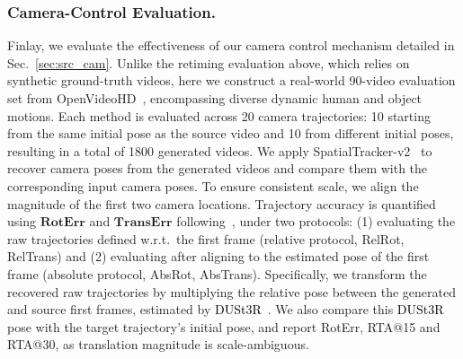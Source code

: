 \documentclass[10pt,twocolumn,letterpaper]{article}
\newcommand{\nameCOLOR}[1]{\textcolor{black}{#1}}
\newcommand{\duster}{\nameCOLOR{\mbox{DUSt3R}}\xspace}
\newcommand{\todo}[1]{{\color{black}#1}}
\begin{document}

















\subsubsection{Camera-Control Evaluation.}
Finlay, we evaluate the effectiveness of our camera control mechanism detailed in Sec.~\ref{sec:src_cam}.
Unlike the retiming evaluation above, which relies on synthetic ground-truth videos, here we construct a real-world 90-video evaluation set from OpenVideoHD~\cite{nan2024openvid}, encompassing diverse dynamic human and object motions.
Each method is evaluated across 20 camera trajectories: 10 starting from the same initial pose as the source video and 10 from different initial poses, resulting in a total of 1800 generated videos.
We apply SpatialTracker-v2~\cite{Xiao2025} to recover camera poses from the generated videos and compare them with the corresponding input camera poses.
\todo{To ensure consistent scale, we align the magnitude of the first two camera locations.}
Trajectory accuracy is quantified using $\mathbf{RotErr}$ and $\mathbf{TransErr}$ following~\cite{He2025camctrl}, under two protocols: (1) evaluating the raw trajectories defined w.r.t.~the first frame (relative protocol, RelRot, RelTrans) and (2) evaluating after aligning to the estimated pose of the first frame (absolute protocol, AbsRot, AbsTrans).
Specifically, we transform the recovered raw trajectories by multiplying the relative pose between the generated and source first frames, estimated by \duster~\cite{dust3r_cvpr24}. 
We also compare this \duster pose with the target trajectory’s initial pose, and report RotErr, RTA@15 and RTA@30, as translation magnitude is scale-ambiguous.
\end{document}
